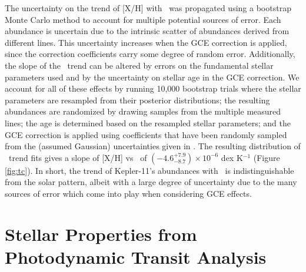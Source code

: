 \documentclass[oneside]{emulateapj}
\begin{document}
The uncertainty on the trend of [X/H] with \tc\ was propagated using a bootstrap Monte Carlo method to account for multiple potential sources of error. Each abundance is uncertain due to the intrinsic scatter of abundances derived from different lines. This uncertainty increases when the GCE correction is applied, since the correction coefficients carry some degree of random error. Additionally, the slope of the \tc\ trend can be altered by errors on the fundamental stellar parameters used \citep[as seen in][]{Teske2015} and by the uncertainty on stellar age in the GCE correction. We account for all of these effects by running 10,000 bootstrap trials where the stellar parameters are resampled from their posterior distributions; the resulting abundances are randomized by drawing samples from the multiple measured lines; the age is determined based on the resampled stellar parameters; and the GCE correction is applied using coefficients that have been randomly sampled from the (assumed Gaussian) uncertainties given in \citet{Spina2016b}. The resulting distribution of \tc\ trend fits gives a slope of [X/H] vs \tc\ of $(-4.6^{+7.9}_{-8.7}) \times 10^{-6}$ dex K$^{-1}$ (Figure  \ref{fig:tc}). In short, the trend of Kepler-11's abundances with \tc\ is indistinguishable from the solar pattern, albeit with a large degree of uncertainty due to the many sources of error which come into play when considering GCE effects.





\section{Stellar Properties from Photodynamic Transit Analysis}
\label{s:ttvs}
\end{document}
